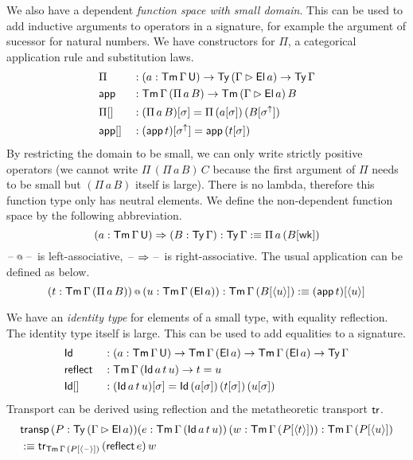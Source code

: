 \documentclass[acmsmall,review,anonymous]{acmart}\settopmatter{printfolios=true,printccs=false,printacmref=false}
\begin{document}
We also have a dependent {\em function space with small domain}. This
can be used to add inductive arguments to operators in a signature,
for example the argument of sucessor for natural numbers. We have
constructors for $\Pi$, a categorical application rule and
substitution laws.
\begin{alignat*}{5}
  & \Pi && : (a:\mathsf{Tm}\,\Gamma\,\mathsf{U})\rightarrow\mathsf{Ty}\,(\Gamma\rhd\mathsf{El}\,a)\rightarrow\mathsf{Ty}\,\Gamma \\
  & \mathsf{app} && : \mathsf{Tm}\,\Gamma\,(\Pi\,a\,B)\rightarrow\mathsf{Tm}\,(\Gamma\rhd \mathsf{El}\,a)\,B \\
  & {\Pi[]} && : (\Pi\,a\,B)[\sigma] = \Pi\,(a[\sigma])\,(B[\sigma^\uparrow]) \\
  & {\mathsf{app}[]} && : (\mathsf{app}\,t)[\sigma^\uparrow] = \mathsf{app}\,(t[\sigma])
\end{alignat*}
By restricting the domain to be small, we can only write strictly
positive operators (we cannot write $\Pi\,(\Pi\,a\,B)\,C$ because the
first argument of $\Pi$ needs to be small but $(\Pi\,a\,B)$ itself is
large). There is no lambda, therefore this function type only has
neutral elements. We define the non-dependent function space by the
following abbreviation.
\[
(a:\mathsf{Tm}\,\Gamma\,\mathsf{U})\Rightarrow(B:\mathsf{Ty}\,\Gamma) :\mathsf{Ty}\,\Gamma :\equiv \Pi\,a\,(B[\mathsf{wk}])
\]
$\mathord{\hspace{1pt}\text{--}\hspace{1pt}}\mathop{{\scriptstyle @}} \mathord{\hspace{1pt}\text{--}\hspace{1pt}}$ is left-associative, $\mathord{\hspace{1pt}\text{--}\hspace{1pt}}\Rightarrow\mathord{\hspace{1pt}\text{--}\hspace{1pt}}$ is
right-associative. The usual application can be defined as below.
\[
 (t:\mathsf{Tm}\,\Gamma\,(\Pi\,a\,B))\mathop{{\scriptstyle @}}\,(u : \mathsf{Tm}\,\Gamma\,(\mathsf{El}\,a)):\mathsf{Tm}\,\Gamma\,(B[\langle u\rangle]) :\equiv (\mathsf{app}\,t)[\langle u \rangle]
\]

We have an \emph{identity type} for elements of a small type, with
equality reflection. The identity type itself is large. This can be
used to add equalities to a signature.
\begin{alignat*}{5}
  & \mathsf{Id} && : (a:\mathsf{Tm}\,\Gamma\,\mathsf{U})\rightarrow\mathsf{Tm}\,\Gamma\,(\mathsf{El}\,a)\rightarrow\mathsf{Tm}\,\Gamma\,(\mathsf{El}\,a)\rightarrow\mathsf{Ty}\,\Gamma \\
  & \mathsf{reflect} && : \mathsf{Tm}\,\Gamma\,(\mathsf{Id}\,a\,t\,u)\rightarrow t = u \\
  & {\mathsf{Id}[]} && : (\mathsf{Id}\,a\,t\,u)[\sigma] = \mathsf{Id}\,(a[\sigma])\,(t[\sigma])\,(u[\sigma])
\end{alignat*}
Transport can be derived using reflection and the metatheoretic
transport $\mathsf{tr}$.
\begin{alignat*}{5}
  & \mathsf{transp}\,(P : \mathsf{Ty}\,(\Gamma \rhd \mathsf{El}\,a))(e:\mathsf{Tm}\,\Gamma\,(\mathsf{Id}\,a\,t\,u))\,(w:\mathsf{Tm}\,\Gamma\,(P[\langle t \rangle])):\mathsf{Tm}\,\Gamma\,(P[\langle u \rangle]) \\
  & :\equiv \mathsf{tr}_{\mathsf{Tm}\,\Gamma\,(P[\langle\mathord{\hspace{1pt}\text{--}\hspace{1pt}}\rangle])}\,(\mathsf{reflect}\,e)\,w
\end{alignat*}
\end{document}
